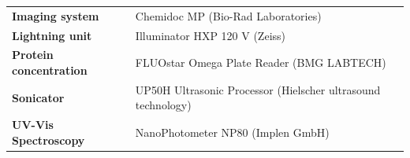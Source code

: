 \begin{longtable}{|L{4.6cm}|L{10cm}|}
 \textbf{Imaging system} & Chemidoc MP (Bio-Rad Laboratories) \\            
                        \textbf{Lightning unit} & Illuminator HXP 120 V (Zeiss) \\
  \textbf{Protein concentration} & FLUOstar Omega Plate Reader (BMG LABTECH) \\
                  \textbf{Sonicator} & UP50H Ultrasonic Processor (Hielscher ultrasound technology) \\	
    \textbf{UV-Vis Spectroscopy} & NanoPhotometer NP80 (Implen GmbH) \\
\end{longtable}



 
